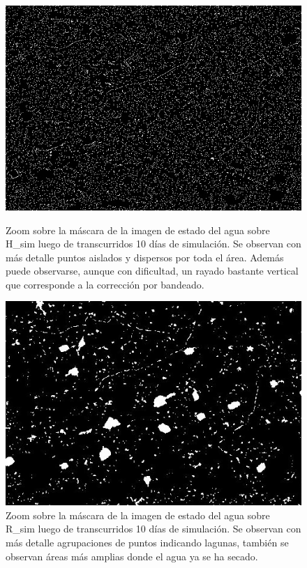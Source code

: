 \documentclass[10pt,a4paper, twoside]{report}
\begin{document}
\begin{figure}[!htb]
   \begin{minipage}{0.48\textwidth}
			\centering
			\includegraphics[width=1.0\linewidth]{imagenes/HSHEDSGlobalZoom.jpg}
			\caption{Zoom sobre la máscara de la imagen de estado del agua sobre H\_sim luego de transcurridos 10 días de simulación. Se observan con más detalle puntos aislados y dispersos por toda el área. Además puede observarse, aunque con dificultad, un rayado bastante vertical que corresponde a la corrección por bandeado.}
			\label{HSHEDSGlobalZoom}
   \end{minipage}\hfill
   \begin {minipage}{0.48\textwidth}
			\centering
			\includegraphics[width=1.0\linewidth]{imagenes/DEMCRGlobalZoom.jpg}
			\caption{Zoom sobre la máscara de la imagen de estado del agua sobre R\_sim luego de transcurridos 10 días de simulación. Se observan con más detalle agrupaciones de puntos indicando lagunas, también se observan áreas más amplias donde el agua ya se ha secado.}
			\label{DEMCRGlobalZoom}
   \end{minipage}
\end{figure}
\end{document}
